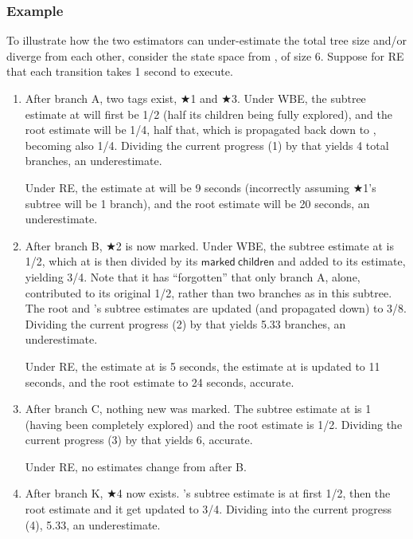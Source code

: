 \subsubsection{Example}

To illustrate how the two estimators can under-estimate the total tree size and/or diverge from each other,
consider the state space from , of size 6.
Suppose for RE that each transition takes 1 second to execute.

\begin{enumerate}
	\item After branch A, two tags exist, $\bigstar$1 and $\bigstar$3.
		Under WBE, the subtree estimate at  will first be 1/2
		(half its children being fully explored),
		and the root estimate will be 1/4,
		half that,
		which is propagated back down to , becoming also 1/4.
		Dividing the current progress (1) by that yields 4 total branches, an underestimate.

		Under RE, the estimate at  will be 9 seconds
		(incorrectly assuming $\bigstar$1's subtree will be 1 branch),
		and the root estimate will be 20 seconds, an underestimate.
	\item After branch B, $\bigstar$2 is now marked.
		Under WBE, the subtree estimate at  is 1/2,
		which at  is then divided by its $\mathsf{marked~children}$
		and added to its estimate, yielding 3/4.
		Note that it has ``forgotten'' that only branch A, alone, contributed to its original 1/2,
		rather than two branches as in this subtree.
		The root and 's subtree estimates are updated (and propagated down) to 3/8.
		Dividing the current progress (2) by that yields 5.33 branches, an underestimate.

		Under RE, the estimate at  is 5 seconds,
		the estimate at  is updated to 11 seconds,
		and the root estimate to 24 seconds, accurate.
	\item After branch C, nothing new was marked.
		The subtree estimate at  is 1
		(having been completely explored)
		and the root estimate is 1/2.
		Dividing the current progress (3) by that yields 6, accurate.

		Under RE, no estimates change from after B.
	\item After branch K, $\bigstar$4 now exists.
		's subtree estimate is at first 1/2,
		then the root estimate and it get updated to 3/4.
		Dividing into the current progress (4), 5.33, an underestimate.


\end{enumerate}
